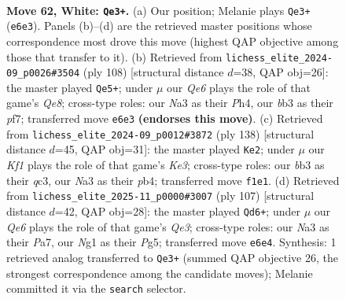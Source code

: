 \documentclass[11pt]{article}
\begin{document}
\clearpage

\begin{figure}[p]\centering
\begin{subfigure}{0.46\textwidth}\centering
\resizebox{\linewidth}{!}{%
\newchessgame
\chessboard[
  setfen={8/4P3/p3Q3/3P2kp/6p1/Nb6/5P1q/5KN1 w - - 3 62},
  showmover=false,
  pgfstyle=straightmove, color=movearrow, markmove={e6-e3}
]}
\caption{}
\end{subfigure}\hfill
\begin{subfigure}{0.46\textwidth}\centering
\resizebox{\linewidth}{!}{%
\newchessgame
\chessboard[
  setfen={4Q3/5pk1/2Nq2p1/7p/7P/6P1/5P1K/8 w - - 2 55},
  showmover=false,
  pgfstyle=straightmove, color=movearrow, markmove={e8-e5}
]}
\caption{}
\end{subfigure}
\\[4pt]
\begin{subfigure}{0.46\textwidth}\centering
\resizebox{\linewidth}{!}{%
\newchessgame
\chessboard[
  setfen={8/5p1k/5Qp1/4P3/1p3PP1/2q1K3/8/8 w - - 8 70},
  showmover=false,
  pgfstyle=straightmove, color=movearrow, markmove={e3-e2}
]}
\caption{}
\end{subfigure}\hfill
\begin{subfigure}{0.46\textwidth}\centering
\resizebox{\linewidth}{!}{%
\newchessgame
\chessboard[
  setfen={6k1/p4p2/4q3/6pP/P1PBp1P1/6K1/4Q3/8 b - - 0 54},
  showmover=false,
  pgfstyle=straightmove, color=movearrow, markmove={e6-d6}
]}
\caption{}
\end{subfigure}
\caption{\textbf{Move 62, White: \texttt{Qe3+}.} (a) Our position; Melanie plays \texttt{Qe3+} (\texttt{e6e3}). Panels (b)--(d) are the retrieved master positions whose correspondence most drove this move (highest QAP objective among those that transfer to it). (b) Retrieved from \texttt{lichess\_elite\_2024-09\_p0026\#3504} (ply 108) [structural distance $d$=38, QAP obj=26]: the master played \texttt{Qe5+}; under $\mu$ our \emph{Qe6} plays the role of that game's \emph{Qe8}; cross-type roles: our \emph{N}a3 as their \emph{P}h4, our \emph{b}b3 as their \emph{p}f7; transferred move \texttt{e6e3} \textbf{(endorses this move)}. (c) Retrieved from \texttt{lichess\_elite\_2024-09\_p0012\#3872} (ply 138) [structural distance $d$=45, QAP obj=31]: the master played \texttt{Ke2}; under $\mu$ our \emph{Kf1} plays the role of that game's \emph{Ke3}; cross-type roles: our \emph{b}b3 as their \emph{q}c3, our \emph{N}a3 as their \emph{p}b4; transferred move \texttt{f1e1}. (d) Retrieved from \texttt{lichess\_elite\_2025-11\_p0000\#3007} (ply 107) [structural distance $d$=42, QAP obj=28]: the master played \texttt{Qd6+}; under $\mu$ our \emph{Qe6} plays the role of that game's \emph{Qe3}; cross-type roles: our \emph{N}a3 as their \emph{P}a7, our \emph{N}g1 as their \emph{P}g5; transferred move \texttt{e6e4}. Synthesis: 1 retrieved analog transferred to \texttt{Qe3+} (summed QAP objective 26, the strongest correspondence among the candidate moves); Melanie committed it via the \texttt{search} selector.}
\label{fig:thought-m122}
\end{figure}
\end{document}
